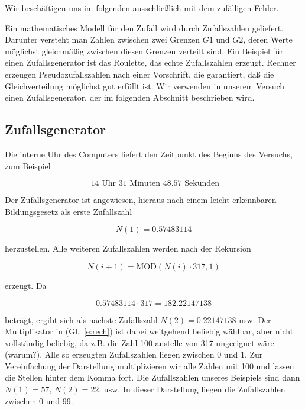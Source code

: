 Wir beschäftigen uns im folgenden ausschließlich mit dem zufälligen
Fehler.

Ein mathematisches Modell für den Zufall wird durch Zufallszahlen
geliefert. Darunter versteht man Zahlen zwischen zwei Grenzen $G1$ und
$G2$, deren Werte möglichst gleichmäßig zwischen diesen Grenzen
verteilt sind. Ein Beispiel für einen Zufallsgenerator ist das
Roulette, das echte Zufallszahlen erzeugt. Rechner erzeugen
Pseudozufallszahlen nach einer Vorschrift, die garantiert, daß die
Gleichverteilung möglichst gut erfüllt ist. Wir verwenden in unserem
Versuch einen Zufallsgenerator, der im folgenden Abschnitt beschrieben
wird.

\subsection{Zufallsgenerator}

Die interne Uhr des Computers liefert den Zeitpunkt des Beginns des
Versuchs, zum Beispiel

\begin{equation} \label{e:uhr}
\mbox{ 14 Uhr 31 Minuten 48.57 Sekunden}
\end{equation}


Der Zufallsgenerator ist angewiesen, hieraus nach einem leicht
erkennbaren Bildungsgesetz als erste Zufallszahl

\begin{equation}   \label{e:zahl}
  N(1)= 0.57483114
\end{equation}

herzustellen. Alle weiteren Zufallszahlen werden nach der Rekursion

\begin{equation}  \label{e:zahl1}
 N(i+1) = \mbox{MOD} \left( N(i) \cdot  317 , 1 \right)
\end{equation}

erzeugt. Da

\begin{equation} \label{e:rech}
 0.57483114 \cdot 317 = 182.22147138
\end{equation}

beträgt, ergibt sich als nächste Zufallszahl $N(2) = 0.22147138$
usw. Der Multiplikator in (Gl.~\ref{e:rech}) ist dabei weitgehend
beliebig wählbar, aber nicht vollständig beliebig, da z.B. die Zahl
100 anstelle von 317 ungeeignet wäre (warum?). Alle so erzeugten
Zufallszahlen liegen zwischen 0 und 1. Zur Vereinfachung der
Darstellung multiplizieren wir alle Zahlen mit 100 und lassen die
Stellen hinter dem Komma fort. Die Zufallszahlen unseres Beispiels sind
dann $N(1) = 57$, $N(2) = 22$, usw. In dieser Darstellung liegen die
Zufallszahlen zwischen 0 und 99.

